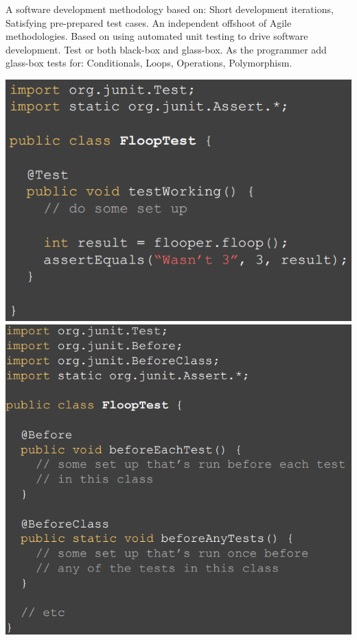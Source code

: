 \documentclass[number]{assignment}
\begin{document}
\begin{landscape}
\begin{multicols}{3}
A software development methodology based on: Short development iterations, Satisfying pre-prepared test cases. An independent offshoot of Agile methodologies. Based on using automated unit testing to drive software development.
Test or both black-box and glass-box. As the programmer add glass-box tests for: Conditionals, Loops, Operations, Polymorphism.
\begin{multicols}{2}
\includegraphics[width=\linewidth]{test1.png}
\includegraphics[width=\linewidth]{test2.png}
\end{multicols}

\end{multicols}
\end{landscape}
\end{document}
